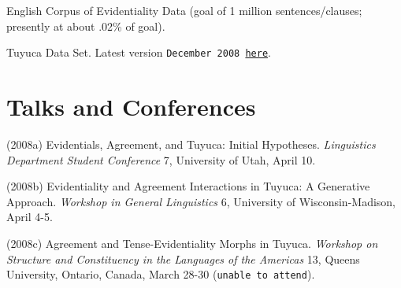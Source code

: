 \documentclass[margin,line]{resume}
\begin{document}
\begin{resume}
English Corpus of Evidentiality Data (goal of 1 million sentences/clauses; presently at about .02\% of goal).




Tuyuca Data Set. Latest version \texttt{December 2008 \href{http://sites.google.com/site/bowleslinguistics/Home/research}{here}}.



\section{Talks and Conferences}
(2008a) Evidentials, Agreement, and Tuyuca: Initial Hypotheses. \emph{Linguistics Department
Student Conference} 7, University of Utah, April 10.

(2008b) Evidentiality and Agreement Interactions in Tuyuca: A Generative Approach.
\emph{Workshop in General Linguistics} 6, University of Wisconsin-Madison, April 4-5.

(2008c) Agreement and Tense-Evidentiality Morphs in Tuyuca. \emph{Workshop on Structure
and Constituency in the Languages of the Americas} 13, Queens University,
Ontario, Canada, March 28-30 (\texttt{unable to attend}).


\end{resume}
\end{document}
